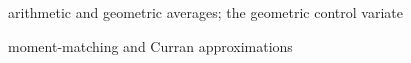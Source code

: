 \begin{planned}
  \item arithmetic and geometric averages; the geometric control variate
  \item moment-matching and Curran approximations
\end{planned}
